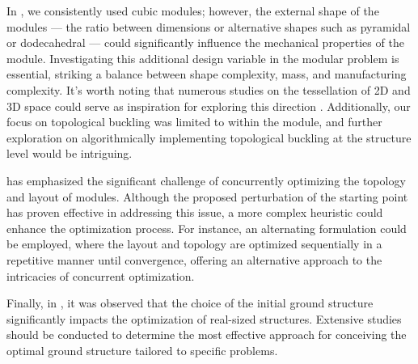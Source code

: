 In , we consistently used cubic modules; however, the external shape of the modules — \ie the ratio between dimensions or alternative shapes such as pyramidal or dodecahedral — could significantly influence the mechanical properties of the module. Investigating this additional design variable in the modular problem is essential, striking a balance between shape complexity, mass, and manufacturing complexity. It's worth noting that numerous studies on the tessellation of 2D and 3D space could serve as inspiration for exploring this direction . Additionally, our focus on topological buckling was limited to within the module, and further exploration on algorithmically implementing topological buckling at the structure level would be intriguing.

 has emphasized the significant challenge of concurrently optimizing the topology and layout of modules. Although the proposed perturbation of the starting point has proven effective in addressing this issue, a more complex heuristic could enhance the optimization process. For instance, an alternating formulation could be employed, where the layout and topology are optimized sequentially in a repetitive manner until convergence, offering an alternative approach to the intricacies of concurrent optimization.

Finally, in , it was observed that the choice of the initial ground structure significantly impacts the optimization of real-sized structures. Extensive studies should be conducted to determine the most effective approach for conceiving the optimal ground structure tailored to specific problems.